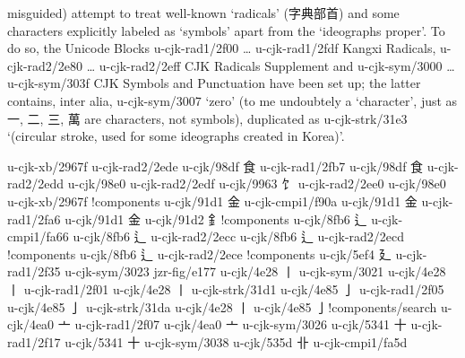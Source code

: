 \begin{multicols}{2}
misguided) attempt to treat well-known ‘radicals’ ({\cjk{}字典部首}) and some characters
explicitly labeled as ‘symbols’ apart from the ‘ideographs proper’. To do
so, the Unicode Blocks
u-cjk-rad1/2f00 … u-cjk-rad1/2fdf {\mktsStyleItalic{}Kangxi Radicals},
u-cjk-rad2/2e80 … u-cjk-rad2/2eff {\mktsStyleItalic{}CJK Radicals Supplement} and
u-cjk-sym/3000 … u-cjk-sym/303f 	{\mktsStyleItalic{}CJK Symbols and Punctuation}
have been set up; the latter contains, inter alia,
u-cjk-sym/3007 {\cjk{}} ‘zero’ (to me undoubtely a ‘character’, just as
{\cjk{}一}, {\cjk{}二}, {\cjk{}三}, {\cjk{}萬} are characters, not symbols), duplicated as
u-cjk-strk/31e3 { }‘(circular stroke, used for some ideographs created
in Korea)’.\mktsShowpar\par
\begingroup\mktsStyleCode{}\begingroup\mktsObeyAllLines{}u-cjk-xb/2967f	{	}u-cjk-rad2/2ede	{} 
u-cjk/98df	{\cjk{}食}	u-cjk-rad1/2fb7	{} 
u-cjk/98df	{\cjk{}食}	u-cjk-rad2/2edd	{} 
u-cjk/98e0	{\cjk{}}	u-cjk-rad2/2edf	{} 
u-cjk/9963	{\cjk{}饣}	u-cjk-rad2/2ee0	{} 
u-cjk/98e0	{\cjk{}}	u-cjk-xb/2967f	{}!components 
u-cjk/91d1	{\cjk{}金}	u-cjk-cmpi1/f90a	{} 
u-cjk/91d1	{\cjk{}金}	u-cjk-rad1/2fa6	{} 
u-cjk/91d1	{\cjk{}金}	u-cjk/91d2	{\cjk{}釒}!components 
u-cjk/8fb6	{\cjk{}辶}	u-cjk-cmpi1/fa66	{} 
u-cjk/8fb6	{\cjk{}辶}	u-cjk-rad2/2ecc	{} 
u-cjk/8fb6	{\cjk{}辶}	u-cjk-rad2/2ecd	{}!components 
u-cjk/8fb6	{\cjk{}辶}	u-cjk-rad2/2ece	{}!components 
u-cjk/5ef4	{\cjk{}廴}	u-cjk-rad1/2f35	{} 
u-cjk-sym/3023	{\cjk{}}	jzr-fig/e177	{} 
u-cjk/4e28	{\cjk{}丨}	u-cjk-sym/3021	{} 
u-cjk/4e28	{\cjk{}丨}	u-cjk-rad1/2f01	{} 
u-cjk/4e28	{\cjk{}丨}	u-cjk-strk/31d1	{} 
u-cjk/4e85	{\cjk{}亅}	u-cjk-rad1/2f05	{} 
u-cjk/4e85	{\cjk{}亅}	u-cjk-strk/31da	{} 
u-cjk/4e28	{\cjk{}丨}	u-cjk/4e85	{\cjk{}亅}!components/search 
u-cjk/4ea0	{\cjk{}亠}	u-cjk-rad1/2f07	{} 
u-cjk/4ea0	{\cjk{}亠}	u-cjk-sym/3026	{} 
u-cjk/5341	{\cjk{}十}	u-cjk-rad1/2f17	{} 
u-cjk/5341	{\cjk{}十}	u-cjk-sym/3038	{} 
u-cjk/535d	{\cjk{}卝}	u-cjk-cmpi1/fa5d	{} 

\end{multicols}

